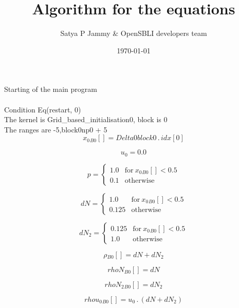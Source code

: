 \documentclass{article}
\title{Algorithm for the equations}
\author{Satya P Jammy \& OpenSBLI developers team}
\date{\today}
\begin{document}
\maketitle
\noindent Starting of the main program\\
\\\noindent Condition Eq(restart, 0)\\\noindent The kernel is Grid_based_initialisation0, block is 0\\\noindent The ranges are -5,block0np0 + 5\\\begin{dmath}{x_{0}{_{B0}}}[{}] = Delta0block0 \,.\, {idx}[{0}]\end{dmath}

\begin{dmath}u_{0} = 0.0\end{dmath}

\begin{dmath}p = \begin{cases} 1.0 & \text{for}\: {x_{0}{_{B0}}}[{}] < 0.5 \\0.1 & \text{otherwise} \end{cases}\end{dmath}

\begin{dmath}dN = \begin{cases} 1.0 & \text{for}\: {x_{0}{_{B0}}}[{}] < 0.5 \\0.125 & \text{otherwise} \end{cases}\end{dmath}

\begin{dmath}dN_{2} = \begin{cases} 0.125 & \text{for}\: {x_{0}{_{B0}}}[{}] < 0.5 \\1.0 & \text{otherwise} \end{cases}\end{dmath}

\begin{dmath}{\rho{_{B0}}}[{}] = dN + dN_{2}\end{dmath}

\begin{dmath}{rhoN{_{B0}}}[{}] = dN\end{dmath}

\begin{dmath}{rhoN_{2}{_{B0}}}[{}] = dN_{2}\end{dmath}

\begin{dmath}{rhou_{0}{_{B0}}}[{}] = u_{0} \,.\, \left(dN + dN_{2}\right)\end{dmath}
\end{document}
